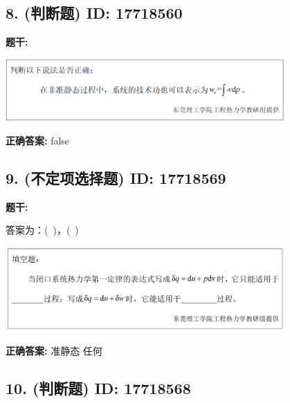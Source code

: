 \documentclass[12pt]{article}
\begin{document}
\vspace{0.5em}\hrulefill\vspace{1em}

\subsection*{8. (判断题) \small ID: 17718560}

\textbf{题干:}


\begin{center}\includegraphics[width=0.8\textwidth, height=0.25\textheight, keepaspectratio]{question_8_17718560/title_img_1.png}\end{center}

\textbf{正确答案:}
false

\vspace{0.5em}\hrulefill\vspace{1em}

\subsection*{9. (不定项选择题) \small ID: 17718569}

\textbf{题干:}

答案为：( )，( )
\begin{center}\includegraphics[width=0.8\textwidth, height=0.25\textheight, keepaspectratio]{question_9_17718569/title_img_1.png}\end{center}

\textbf{正确答案:}
准静态
任何

\vspace{0.5em}\hrulefill\vspace{1em}

\subsection*{10. (判断题) \small ID: 17718568}
\end{document}

